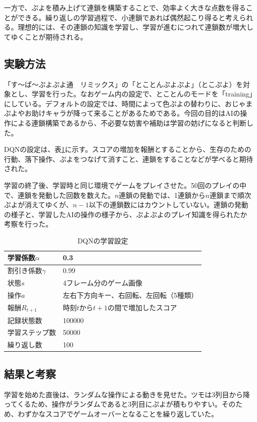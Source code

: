 \documentclass[12pt]{jreport}
\begin{document}
一方で、ぷよを積み上げて連鎖を構築することで、効率よく大きな点数を得ることができる。繰り返しの学習過程で、小連鎖であれば偶然起こり得ると考えられる。理想的には、その連鎖の知識を学習し、学習が進むにつれて連鎖数が増大してゆくことが期待される。

\subsection{実験方法}
「す～ぱ～ぷよぷよ通　リミックス」の「とことんぷよぷよ」（とこぷよ）を対象とし、学習を行った。なおゲーム内の設定で、とことんのモードを「training」にしている。デフォルトの設定では、時間によって色ぷよの替わりに、おじゃまぷよやお助けキャラが降って来ることがあるためである。今回の目的はAIの操作による連鎖構築であるから、不必要な妨害や補助は学習の妨げになると判断した。

DQNの設定は、表\ref{tab:dqn_conf}に示す。スコアの増加を報酬とすることから、生存のための行動、落下操作、ぷよをつなげて消すこと、連鎖をすることなどが学べると期待された。

学習の終了後、学習時と同じ環境でゲームをプレイさせた。50回のプレイの中で、連鎖を発動した回数を数えた。$n$連鎖の発動では、1連鎖から$n$連鎖まで順次ぷよが消えてゆくが、$n-1$以下の連鎖数にはカウントしていない。連鎖の発動の様子と、学習したAIの操作の様子から、ぷよぷよのプレイ知識を得られたか考察を行った。

\begin{table}[tb]
\begin{center}
\caption{DQNの学習設定} \label{tab:dqn_conf}
\begin{tabular}{|l|l|} \hline
  学習係数$\alpha$ & 0.3\\ \hline
  割引き係数$\gamma$ & 0.99\\ \hline
  状態$s$ & 4フレーム分のゲーム画像\\ \hline
  操作$a$ & 左右下方向キー、右回転、左回転（5種類）\\ \hline
  報酬$R_{t+1}$ & 時刻$t$から$t+1$の間で増加したスコア\\ \hline
  記録状態数 & 100000\\ \hline
  学習ステップ数 & 50000\\ \hline
  繰り返し数 & 100\\ \hline
\end{tabular}
\end{center}
\end{table}

\subsection{結果と考察}
学習を始めた直後は、ランダムな操作による動きを見せた。ツモは3列目から降ってくるため、操作がランダムであると3列目にぷよが積もりやすい。そのため、わずかなスコアでゲームオーバーとなることを繰り返していた。
\end{document}
